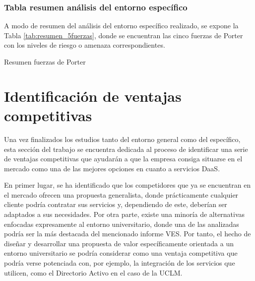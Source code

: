 \subsubsection{Tabla resumen análisis del entorno específico}
A modo de resumen del análisis del entorno específico realizado, se expone la Tabla \ref{tab:resumen_5fuerzas}, donde se encuentran las cinco fuerzas de Porter con los niveles de riesgo o amenaza correspondientes.

\begin{table}[!htbp]
	\centering
	{\small
		
	}
	\caption[Resumen fuerzas de Porter]
	{Resumen fuerzas de Porter}
	\label{tab:resumen_5fuerzas}
\end{table}

\clearpage

\section{Identificación de ventajas competitivas}
Una vez finalizados los estudios tanto del entorno general como del específico, esta sección del trabajo se encuentra dedicada al proceso de identificar una serie de ventajas competitivas que ayudarán a que la empresa consiga situarse en el mercado como una de las mejores opciones en cuanto a servicios \acs{DaaS}.

En primer lugar, se ha identificado que los competidores que ya se encuentran en el mercado ofrecen una propuesta generalista, donde prácticamente cualquier cliente podría contratar sus servicios y, dependiendo de este, deberían ser adaptados a sus necesidades. Por otra parte, existe una minoría de alternativas enfocadas expresamente al entorno universitario, donde una de las analizadas podría ser la más destacada del mencionado informe \acs{VES}. Por tanto, el hecho de diseñar y desarrollar una propuesta de valor específicamente orientada a un entorno universitario se podría considerar como una ventaja competitiva que podría verse potenciada con, por ejemplo, la integración de los servicios que utilicen, como el Directorio Activo en el caso de la \acf{UCLM}.

